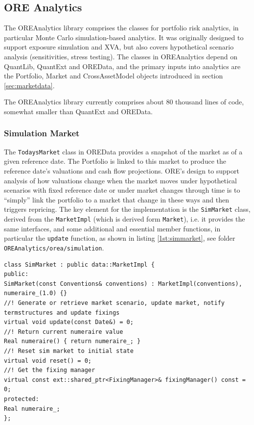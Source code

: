 \documentclass[12pt, a4paper]{report}
\begin{document}
\subsection{ORE Analytics}

The OREAnalytics library comprises the classes for portfolio risk analytics, in particular Monte Carlo simulation-based analytics. It was originally designed to support exposure simulation and XVA, but also covers hypothetical scenario analysis
(sensitivities, stress testing). The classes in OREAnalytics depend on QuantLib, QuantExt and OREData, and the primary inputs into analytics are the Portfolio, Market and CrossAssetModel objects introduced in section \ref{sec:marketdata}.

The OREAnalytics library currently comprises about 80 thousand lines of code, somewhat smaller than QuantExt and OREData.

\subsubsection{Simulation Market}
The {\tt TodaysMarket} class in OREData provides a snapshot of the market as of a given reference date. The Portfolio is linked to this market to produce the reference date's valuations and cash flow projections. ORE's design to support analysis of how
valuations change when the market moves under hypothetical scenarios with fixed reference date or under market changes through time is to ``simply'' link the portfolio to a market that change in these ways and then triggers repricing. 
The key element for the implementation is the {\tt SimMarket} class, derived from the {\tt MarketImpl} (which is derived form {\tt Market}), i.e. it provides the same interfaces, and some additional and essential member functions, 
in particular the {\tt update} function, as shown in listing \ref{1st:simmarket}, see folder {\tt OREAnalytics/orea/simulation}.

\begin{listing}[H]
\begin{verbatim}
class SimMarket : public data::MarketImpl {
public:
SimMarket(const Conventions& conventions) : MarketImpl(conventions), numeraire_(1.0) {}
//! Generate or retrieve market scenario, update market, notify termstructures and update fixings
virtual void update(const Date&) = 0;
//! Return current numeraire value
Real numeraire() { return numeraire_; }
//! Reset sim market to initial state
virtual void reset() = 0;
//! Get the fixing manager
virtual const ext::shared_ptr<FixingManager>& fixingManager() const = 0;
protected:
Real numeraire_;
};
\end{verbatim}
\caption{Simulation Market base class.}
\label{1st:simmarket}
\end{listing}
\end{document}

